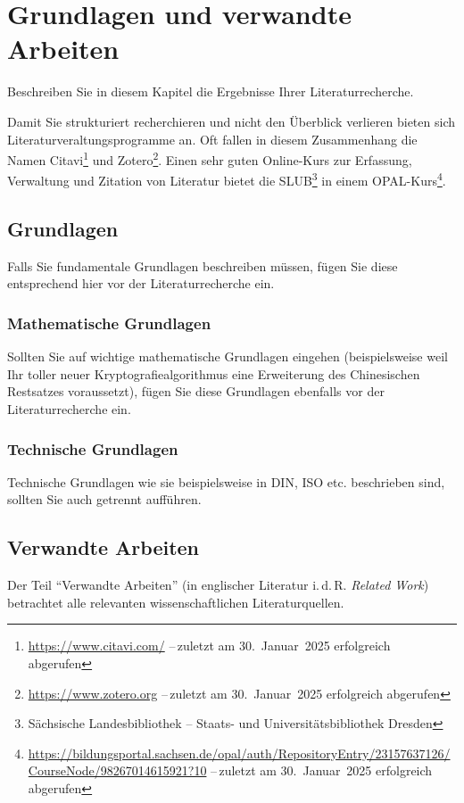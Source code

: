 \chapter{Grundlagen und verwandte Arbeiten}\label{chap:RelatedWork}
Beschreiben Sie in diesem Kapitel die Ergebnisse Ihrer Literaturrecherche.

Damit Sie strukturiert recherchieren und nicht den Überblick verlieren bieten sich Literaturveraltungsprogramme an. Oft fallen in diesem Zusammenhang die Namen Citavi\footnote{\url{https://www.citavi.com/} --\,zuletzt am 30.~Januar~2025 erfolgreich abgerufen} und Zotero\footnote{\url{https://www.zotero.org} --\,zuletzt am 30.~Januar~2025 erfolgreich abgerufen}. Einen sehr guten Online-Kurs zur Erfassung, Verwaltung und Zitation von Literatur bietet die SLUB\footnote{Sächsische Landesbibliothek -- Staats- und Universitätsbibliothek Dresden} in einem OPAL-Kurs\footnote{\url{https://bildungsportal.sachsen.de/opal/auth/RepositoryEntry/23157637126/CourseNode/98267014615921?10} --\,zuletzt am 30.~Januar~2025 erfolgreich abgerufen}.

\section{Grundlagen}\label{sec:RelatedWork:Foundations}
Falls Sie fundamentale Grundlagen beschreiben müssen, fügen Sie diese entsprechend hier vor der Literaturrecherche ein.

\subsection{Mathematische Grundlagen}\label{subsec:RelatedWork:Foundations:Maths}
Sollten Sie auf wichtige mathematische Grundlagen eingehen (beispielsweise weil Ihr toller neuer Kryptografiealgorithmus eine Erweiterung des Chinesischen Restsatzes voraussetzt), fügen Sie diese Grundlagen ebenfalls vor der Literaturrecherche ein.

\subsection{Technische Grundlagen}\label{subsec:RelatedWork:Foundations:Techs}
Technische Grundlagen wie sie beispielsweise in DIN, ISO etc. beschrieben sind, sollten Sie auch getrennt aufführen.

\section{Verwandte Arbeiten}\label{sec:RelatedWork:Publications}
Der Teil \enquote{Verwandte Arbeiten} (in englischer Literatur i.\,d.\,R. \emph{Related Work}) betrachtet alle relevanten wissenschaftlichen Literaturquellen.

